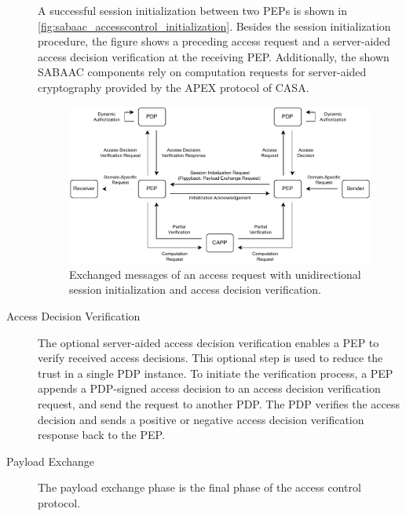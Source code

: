 \begin{description}
    A successful session initialization between two PEPs is shown in \autoref{fig:sabaac_accesscontrol_initialization}.
    Besides the session initialization procedure, the figure shows a preceding access request and a server-aided access decision verification at the receiving PEP.
    Additionally, the shown SABAAC components rely on computation requests for server-aided cryptography provided by the APEX protocol of CASA.
    \begin{figure}
        \centering
        \includegraphics[width=1.0\linewidth]{figures/SABAAC_protocols_accesscontrol_initialization.drawio.pdf}
        \caption{Exchanged messages of an access request with unidirectional session initialization and access decision verification.
        }
        \label{fig:sabaac_accesscontrol_initialization}
    \end{figure}
    \item[Access Decision Verification] The optional server-aided access decision verification enables a PEP to verify received access decisions.
    This optional step is used to reduce the trust in a single PDP instance.
    To initiate the verification process, a PEP appends a PDP-signed access decision to an access decision verification request, and send the request to another PDP.
    The PDP verifies the access decision and sends a positive or negative access decision verification response back to the PEP.
    \item[Payload Exchange] The payload exchange phase is the final phase of the access control protocol.

\end{description}
